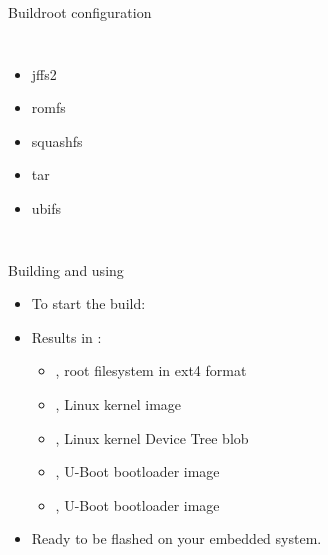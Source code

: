 \documentclass[aspectratio=169,obeyspaces,spaces,hyphens,dvipsnames]{beamer}
\begin{document}
\begin{frame}{Buildroot configuration}
\begin{columns}
{\begin{itemize}
      \item jffs2
      \item romfs
      \item squashfs
      \item tar
      \item ubifs
      \end{itemize}
    }
  \end{columns}
\end{frame}

\begin{frame}{Building and using}
  \begin{itemize}
  \item To start the build: 
  \item Results in :
    \begin{itemize}
    \item {}, root filesystem in ext4 format
    \item {}, Linux kernel image
    \item {}, Linux kernel Device Tree
      blob
    \item {}, U-Boot bootloader image
    \item {}, U-Boot bootloader image
    \end{itemize}
  \item Ready to be flashed on your embedded system.
  \end{itemize}
\end{frame}
\end{document}

